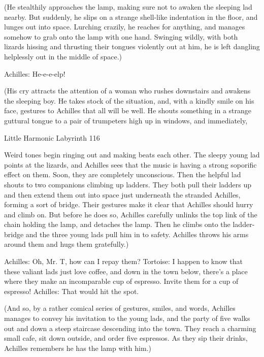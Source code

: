              (He stealthily approaches the lamp, making sure not to awaken the
             sleeping lad nearby. But suddenly, he slips on a strange shell-like
             indentation in the floor, and lunges out into space. Lurching crazily, he
             reaches for anything, and manages somehow to grab onto the lamp with
             one hand. Swinging wildly, with both lizards hissing and thrusting their
             tongues violently out at him, he is left dangling helplessly out in the middle
             of space.)

          Achilles: He-e-e-elp!

             (His cry attracts the attention of a woman who rushes downstairs and
             awakens the sleeping boy. He takes stock of the situation, and, with a
             kindly smile on his face, gestures to Achilles that all will be well. He shouts
             something in a strange guttural tongue to a pair of trumpeters high up in
             windows, and immediately,




Little Harmonic Labyrinth                                                               116

             Weird tones begin ringing out and making beats each other. The sleepy
             young lad points at the lizards, and Achilles sees that the music is having a
             strong soporific effect on them. Soon, they are completely unconscious.
             Then the helpful lad shouts to two companions climbing up ladders. They
             both pull their ladders up and then extend them out into space just
             underneath the stranded Achilles, forming a sort of bridge. Their gestures
             make it clear that Achilles should hurry and climb on. But before he does
             so, Achilles carefully unlinks the top link of the chain holding the lamp, and
             detaches the lamp. Then he climbs onto the ladder-bridge and the three
             young lads pull him in to safety. Achilles throws his arms around them and
             hugs them gratefully.)

          Achilles: Oh, Mr. T, how can I repay them?
          Tortoise: I happen to know that these valiant lads just love coffee, and down
                 in the town below, there's a place where they make an incomparable
                 cup of espresso. Invite them for a cup of espresso! Achilles: That
                 would hit the spot.

             (And so, by a rather comical series of gestures, smiles, and words, Achilles
             manages to convey his invitation to the young lads, and the party of five
             walks out and down a steep staircase descending into the town. They reach
             a charming small cafe, sit down outside, and order five espressos. As they
             sip their drinks, Achilles remembers he has the lamp with him.)

